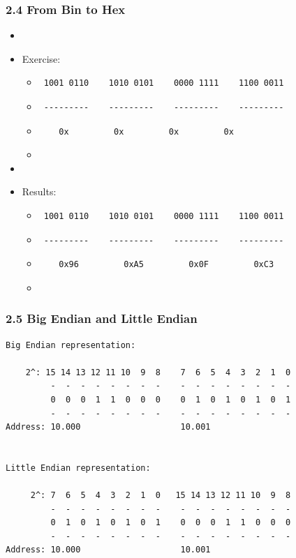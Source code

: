 \begin{frame}[fragile]
  \frametitle{2.4 From Bin to Hex}
    \begin{itemize}
        \item[]
        \item[] Exercise:
            \begin{itemize}
                \item[] \begin{verbatim} 1001 0110    1010 0101    0000 1111    1100 0011\end{verbatim}
                \item[] \begin{verbatim} ---------    ---------    ---------    ---------\end{verbatim}
                \item[] \begin{verbatim}    0x         0x         0x         0x  \end{verbatim}
                \item[] 
            \end{itemize}
        \item[]
        \item[] Results:
            \begin{itemize}
                \item[] \begin{verbatim} 1001 0110    1010 0101    0000 1111    1100 0011\end{verbatim}
                \item[] \begin{verbatim} ---------    ---------    ---------    ---------\end{verbatim}
                \item[] \begin{verbatim}    0x96         0xA5         0x0F         0xC3  \end{verbatim}
                \item[] 
            \end{itemize}
    \end{itemize}
\end{frame}


\begin{frame}[fragile]
  \frametitle{2.5 Big Endian and Little Endian}
	\begin{lstlisting}
Big Endian representation:

    2^: 15 14 13 12 11 10  9  8    7  6  5  4  3  2  1  0
         -  -  -  -  -  -  -  -    -  -  -  -  -  -  -  - 
         0  0  0  1  1  0  0  0    0  1  0  1  0  1  0  1 
         -  -  -  -  -  -  -  -    -  -  -  -  -  -  -  - 
Address: 10.000                    10.001 
           
            
Little Endian representation:

     2^: 7  6  5  4  3  2  1  0   15 14 13 12 11 10  9  8 
         -  -  -  -  -  -  -  -    -  -  -  -  -  -  -  - 
         0  1  0  1  0  1  0  1    0  0  0  1  1  0  0  0 
         -  -  -  -  -  -  -  -    -  -  -  -  -  -  -  - 
Address: 10.000                    10.001 
	\end{lstlisting}
\end{frame}


